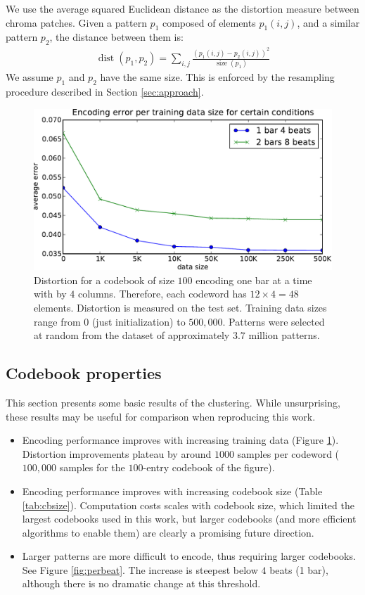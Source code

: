 \documentclass{article}
\DeclareMathOperator*{\dist}{dist}
\DeclareMathOperator*{\size}{size}
\begin{document}
We use the average squared Euclidean distance as the distortion
measure between chroma patches.  Given a pattern $p_1$
composed of elements $p_1(i,j)$, and a similar pattern $p_2$, the
distance between them is:
\begin{eqnarray}
  \dist(p_1,p_2) = \sum_{i,j} \frac{(p_1(i,j) - p_2(i,j))^2}{\size(p_1)}
  \label{eq:dist}
\end{eqnarray}
We assume $p_1$ and $p_2$ have the same size.  This is enforced by the
resampling procedure described in Section \ref{sec:approach}.


\begin{figure}[t]
\begin{center}
\includegraphics[width=.8\columnwidth]{data_sizes}
\end{center}
\caption{\small{Distortion for a codebook of size $100$ encoding one bar
at a time with by $4$ columns.
Therefore, each codeword has $12 \times 4 = 48$ elements.
Distortion is measured on the test set.  Training data sizes range
from $0$ (just initialization) to $500,000$. Patterns were selected at
random from the dataset of approximately $3.7$ million patterns.
}}
\label{fig:data_sizes}
\end{figure}


\subsection{Codebook properties}
This section presents some basic results of the clustering.
While unsurprising, these results may be useful for comparison 
when reproducing this work.
\begin{itemize}
\item Encoding performance improves with increasing training data (Figure
\ref{fig:data_sizes}). Distortion improvements plateau by around $1000$ samples 
per codeword ($100,000$ samples for the $100$-entry codebook of the figure).
\item Encoding performance improves with increasing codebook size
(Table \ref{tab:cbsize}).  Computation costs scales with codebook size, 
which limited the largest codebooks used in this work, but larger codebooks 
(and more efficient algorithms to enable them) are clearly a promising future 
direction.
\item Larger patterns are more difficult to encode, thus requiring
larger codebooks. See Figure \ref{fig:perbeat}. The increase is steepest
below $4$ beats (1 bar), although there is no dramatic change at 
this threshold.
\end{itemize}
\end{document}
